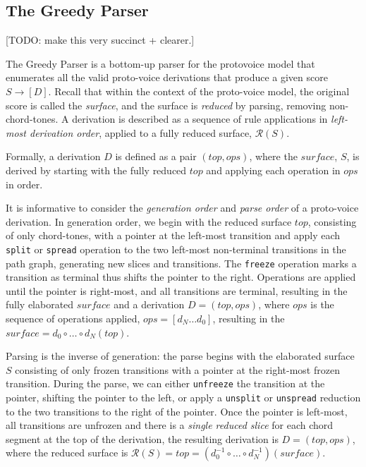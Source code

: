 \documentclass[12pt,a4paper,twoside,openany]{report} \usepackage[pdfborder={0 0 0}]{hyperref}    %
\theoremstyle{definition} \newtheorem{definition}{Definition}[section]
\begin{document}
      \subsection{The Greedy Parser}
      [TODO: make this very succinct + clearer.]

      The Greedy Parser is a bottom-up parser for the protovoice model that enumerates all the valid
      proto-voice
      derivations that produce a given score $S \to [D]$. Recall that within the context of the proto-voice model, the
      original score is called the \textit{surface}, and the surface is \textit{reduced} by parsing, removing
      non-chord-tones. A derivation is described as a sequence of rule applications in \textit{left-most derivation
      order}, applied to a fully reduced surface, $\mathcal{R}(S)$. 

      Formally, a derivation $D$ is defined as a pair $(top, ops)$, where the $surface$, $S$, is derived by starting
      with the fully reduced $top$ and applying each operation in $ops$ in order. 

      It is informative to consider the \textit{generation order} and \textit{parse order} of a proto-voice derivation.
      In generation order, we begin with the reduced surface $top$, consisting of only chord-tones, with a pointer at
      the left-most transition and apply each \texttt{split} or \texttt{spread} operation to the two left-most
      non-terminal transitions in the path graph, generating new slices and transitions. The \texttt{freeze} operation
      marks a transition as terminal thus shifts the pointer to the right. Operations are applied until the pointer is
      right-most, and all transitions are terminal, resulting in the fully elaborated $surface$ and a derivation
      $D=(top, ops)$, where $ops$ is the sequence of operations applied, $ops = [d_N \dots d_0]$, resulting in the
      $surface = d_0 \circ \dots \circ d_N (top) $.

      Parsing is the inverse of generation: the parse begins with the elaborated surface $S$ consisting of only frozen
      transitions with a pointer at the right-most frozen transition. During the parse, we can either \texttt{unfreeze}
      the transition at the pointer, shifting the pointer to the left, or apply a \texttt{unsplit} or \texttt{unspread}
      reduction to the two transitions to the right of the pointer. Once the pointer is left-most, all transitions are
      unfrozen and there is a \textit{single reduced slice} for each chord segment at the top of the derivation, the
      resulting derivation is $D = (top, ops)$, where the reduced surface is $\mathcal{R}(S)= top = (d_0^{-1} \circ \dots \circ
      d_N^{-1}) (surface)$.
\end{document}
